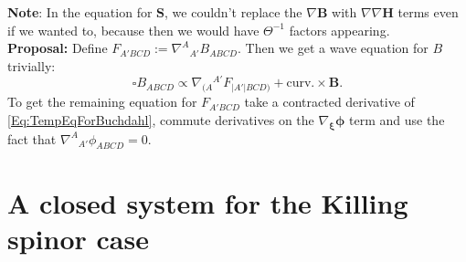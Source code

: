\documentclass[10pt,a4paper]{article}
\theoremstyle{plain}
\def\bmB{{\bm B}}
\def\bmH{{\bm H}}
\def\bmS{{\bm S}}
\def\bmB{{\bm B}}
\def\bmH{{\bm H}}
\def\bmS{{\bm S}}
\begin{document}
\textbf{Note}: In the equation for $\bmS$, we couldn't replace the $\nabla \bmB$ with $\nabla\nabla\bmH$ terms even if we wanted to, because then we would have $\Theta^{-1}$ factors appearing. 
\\

\textbf{Proposal:} Define $F_{A'BCD}:=\nabla^A{}_{A'}B_{ABCD}$. Then we get a wave equation for $B$ trivially:
\[\square B_{ABCD} \propto \nabla_{(A}{}^{A'}F_{\vert A'\vert BCD)} + \text{curv.}\times \bmB. \]
To get the remaining equation for $F_{A'BCD}$ take a contracted derivative of \eqref{Eq:TempEqForBuchdahl}, commute derivatives on the $\nabla_{\bm\xi}\bm\phi$ term and use the fact that $\nabla^A{}_{A'}\phi_{ABCD}=0.$

\section{A closed system for the Killing spinor case}
\end{document}
